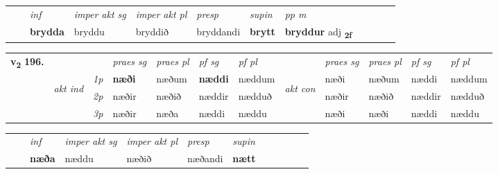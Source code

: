 \begin{tabular}{llllllllllll}
 & & \textit{inf} & \textit{imper akt sg} & \textit{imper akt pl}   & \textit{presp} & \textit{supin}  & \textit{pp m}     \\*
  & & \textbf{brydda} & bryddu  & bryddið   & bryddandi &  \textbf{brytt}  & \textbf{bryddur} adj \textbf{\textsubscript{2f}} \\*
\cmidrule{1-12}
\end{tabular}



\begin{tabular}{llllllllllll} \toprule
\multirow{4}{*}{{{\textbf{v{\textsubscript{2}}} \Large{\textbf{196.}}}}}  & &   &  \textit{praes sg}  & \textit{praes pl}  &\textit{ pf sg} & \textit{pf pl} &  &  \textit{praes sg}  & \textit{praes pl}  & \textit{pf sg} & \textit{pf pl } \\*
	\cmidrule{4-7} \cmidrule{9-12}
 & \multirow{3}{*}{\begin{turn}{90}\textit{akt ind}\end{turn}} & {\textit{1p}} & \textbf{næði} & næðum    & \textbf{næddi} & næddum & \multirow{3}{*}{\begin{turn}{90}\textit{akt con}\end{turn}} &næði & næðum & næddi & næddum\\*
& &  {\textit{2p}} &  næðir  & næðið   & næddir & nædduð & & næðir & næðið & næddir & nædduð \\*
& &  {\textit{3p}} & næðir & næða   & næddi & næddu & & næði & næði& næddi & næddu  \\*
\cmidrule{4-7} \cmidrule{9-12}
\end{tabular}


\begin{tabular}{llllllllllll}
 & & \textit{inf} & \textit{imper akt sg} & \textit{imper akt pl}   & \textit{presp} & \textit{supin}       \\*
  & & \textbf{næða} & næddu  & næðið   & næðandi &  \textbf{nætt}   \\*
\cmidrule{1-12}
\end{tabular}



